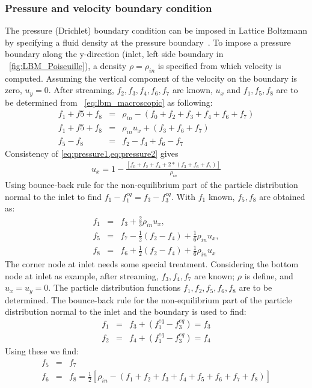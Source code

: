 \subsubsection*{Pressure and velocity boundary condition}
The pressure (Drichlet) boundary condition can be imposed in Lattice Boltzmann by specifying a fluid density at the pressure boundary~\citep{Zou1997}. To impose a pressure boundary along the y-direction (inlet, left side boundary in ~\cref{fig:LBM_Poiseuille}), a density $\rho = \rho_{in}$ is specified from which velocity is computed. Assuming the vertical component of the velocity on the boundary is zero, $u_y=0$. After streaming, $f_2, f_3, f_4, f_6, f_7$ are known, $u_x$ and $f_1, f_5, f_8$ are to be determined from ~\cref{eq:lbm_macroscopic} as following:
\begin{align}
f_1+f5+f_8 & = & \rho_{in} - (f_0+f_2+f_3+f_4+f_6+f_7) \label{eq:pressure1}\\
f_1+f5+f_8 & = & \rho_{in}u_x + (f_3+f_6+f_7) \label{eq:pressure2} \\
f_5 - f_8  & = & f_2 - f_4 +f_6 -f_7
\end{align}
\noindent Consistency of \cref{eq:pressure1,eq:pressure2} gives
\begin{align}
u_x = 1 - \frac{[f_0+f_2+f_4+2*(f_3+f_6+f_7)]}{\rho_{in}}
\end{align}
Using bounce-back rule for the non-equilibrium part of the particle distribution normal to the inlet to find $f_1 -f_1^{eq} = f_3 -f_3^{eq}$. With $f_1$ known, $f_5,f_8$ are obtained as:
\begin{align}
f_1 & = & f_3 + \frac{2}{3} \rho_{in}u_x, \nonumber \\ 
f_5 & = & f_7 - \frac{1}{2}(f_2 - f_4) + \frac{1}{6}\rho_{in}u_x,\nonumber \\ 
f_8 & = & f_6 + \frac{1}{2}(f_2 - f_4) + \frac{1}{6}\rho_{in}u_x
\end{align}
The corner node at inlet needs some special treatment. Considering the bottom node at inlet as example, after streaming, $f_3, f_4, f_7$ are known; $\rho$ is define, and $u_x = u_y = 0$. The particle distribution functions $f_1, f_2, f_5, f_6, f_8$ are to be determined. The bounce-back rule for the non-equilibrium part of the particle distribution normal to the inlet and the boundary is used to find:
\begin{align}
f_1 & = & f_3 + (f_1^{eq}-f_3^{eq}) = f_3 \\
f_2 & = & f_4 + (f_1^{eq}-f_3^{eq}) = f_4
\end{align}
\noindent Using these we find: 
\begin{align}
f_5 & = & f_7 \\
f_6 & = & f_8 = \frac{1}{2}[\rho_{in} - (f_1 + f_2 + f_3 + f_4 + f_5 + f_6 + f_7 + f_8)]
\end{align}

